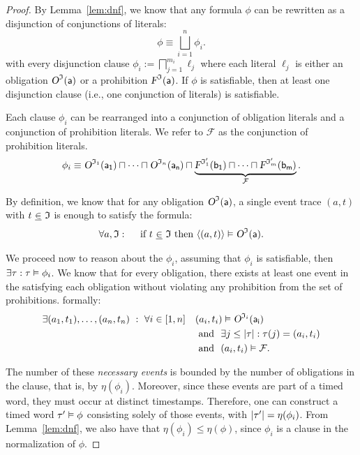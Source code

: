  \begin{proof}
	By Lemma~\ref{lem:dnf}, we know that any formula $\phi$ can be rewritten as a disjunction of conjunctions of literals:
    \[
        \phi \equiv \bigsqcup_{i=1}^n \phi_i.
    \]
    with every disjunction clause $\phi_i:= \bigsqcap_{j=1}^{m_i} \ell_j$ where each literal $\ell_{j}$ is either an obligation $\textsl{O}^{\mathfrak{I}}(\mathsf{a})$ or a prohibition $\textsl{F}^{\mathfrak{I}}(\mathsf{a})$. If $\phi$ is satisfiable, then at least one disjunction clause (i.e., one conjunction of literals) is satisfiable. 

    Each clause $\phi_i$ can be rearranged into a conjunction of obligation literals and a conjunction of prohibition literals. We refer to $\mathcal{F}$ as the conjunction of prohibition literals.
    \[
        \phi_i \equiv \textsl{O}^{\mathfrak{I}_1}(\mathsf{a_1})\sqcap \dots \sqcap\textsl{O}^{\mathfrak{I}_n}(\mathsf{a_n})\sqcap
         \underbrace{\textsl{F}^{\mathfrak{I}'_1}(\mathsf{b_1})\sqcap \dots\sqcap \textsl{F}^{\mathfrak{I}'_m}(\mathsf{b_m})}_{\mathcal{F}}.
    \]

   

    By definition, we know that for any obligation $\textsl{O}^{\mathfrak{I}}(\mathsf{a})$, a single event trace $(a,t)$ with  $t ~\underline{\in}~ \mathfrak{I}$ is enough to satisfy the formula:
    \[
        \forall a, \mathfrak{I}: \quad \text{ if }t ~\underline{\in}~ \mathfrak{I} \text{ then } \langle (a,t) \rangle  \vDash  \textsl{O}^{\mathfrak{I}}(\mathsf{a}).
    \]

We proceed now to reason about the $\phi_i$, assuming that $\phi_i$ is satisfiable, then $\exists \tau: \tau \vDash  \phi_i$. We know that for every obligation, there exists at least one event in the \timedword satisfying each obligation without violating any prohibition from the set of prohibitions. formally:
\[
\begin{aligned}
\exists (a_1, t_1), \dots, (a_n, t_n) \ : \ 
\forall i \in [1, n] \quad
& (a_i, t_i) \dutysat \ob{\is_i}{a_i} \\
& \nd \ \exists j \leq |\tau| : \tau(j) = (a_i, t_i) \\
& \nd \ (a_i, t_i) \dutysat \mathcal{F}.
\end{aligned}
\]

The number of these \emph{necessary events} is bounded by the number of obligations in the clause, that is, by $\eta(\phi_i)$. Moreover, since these events are part of a timed word, they must occur at distinct timestamps. Therefore, one can construct a timed word $\tau' \vDash  \phi$ consisting solely of those events, with $\vert \tau'\vert = \eta(\phi_i)$. From Lemma~\ref{lem:dnf}, we also have that $\eta(\phi_i) \leq \eta(\phi)$, since $\phi_i$ is a clause in the \dnf normalization of $\phi$.
    
\end{proof}


